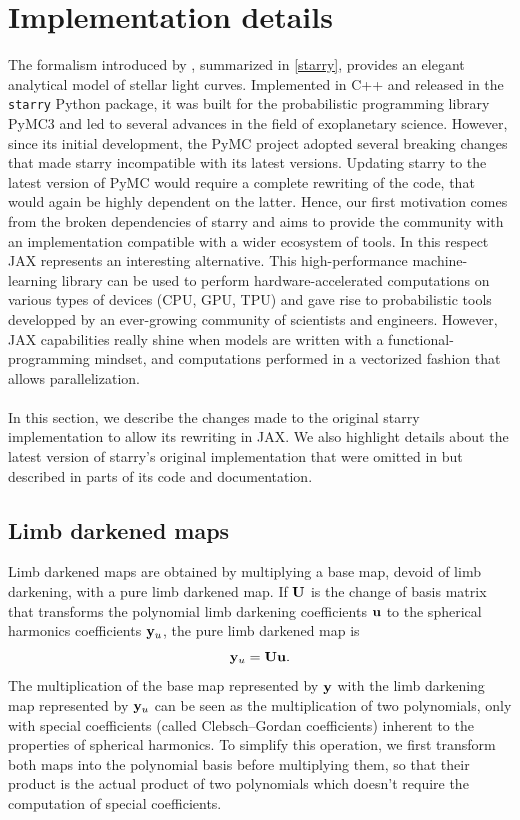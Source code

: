 \documentclass[modern]{aastex631}
\begin{document}
\section{Implementation details}\label{optimization}
The formalism introduced by \cite{starry}, summarized in \autoref{starry}, provides an elegant analytical model of stellar light curves. Implemented in C++ and released in the \texttt{starry} Python package, it was built for the probabilistic programming library \textsf{PyMC3} and led to several advances in the field of exoplanetary science. However, since its initial development, the \textsf{PyMC} project adopted several breaking changes that made \textsf{starry} incompatible with its latest versions. Updating \textsf{starry} to the latest version of \textsf{PyMC} would require a complete rewriting of the code, that would again be highly dependent on the latter. Hence, our first motivation comes from the broken dependencies of \textsf{starry} and aims to provide the community with an implementation compatible with a wider ecosystem of tools. In this respect \textsf{JAX} represents an interesting alternative. This high-performance machine-learning library can be used to perform hardware-accelerated computations on various types of devices (CPU, GPU, TPU) and gave rise to probabilistic tools developped by an ever-growing community of scientists and engineers. However, \textsf{JAX} capabilities really shine when models are written with a functional-programming mindset, and computations performed in a vectorized fashion that allows parallelization.\\\\
In this section, we describe the changes made to the original \textsf{starry} implementation to allow its rewriting in \textsf{JAX}. We also highlight details about the latest version of \textsf{starry}'s original implementation that were omitted in \citealt{starry} but described in parts of its code and documentation. 

\subsection{Limb darkened maps}
Limb darkened maps are obtained by multiplying a base map, devoid of limb darkening, with a pure limb darkened map. If ${\mathbf{U}}$ is the change of basis matrix that transforms the polynomial limb darkening coefficients ${\mathbf{u}}$ to the spherical harmonics coefficients ${\mathbf{y}}_u$, the pure limb darkened map is
\begin{equation}
    \label{eq:limb_darkening_map}
    \bvec{y}_u = \bvec{U}\bvec{u}.
\end{equation}
The multiplication of the base map represented by ${\mathbf{y}}$ with the limb darkening map represented by ${\mathbf{y}}_u$ can be seen as the multiplication of two polynomials, only with special coefficients (called Clebsch–Gordan coefficients) inherent to the properties of spherical harmonics. To simplify this operation, we first transform both maps into the polynomial basis before multiplying them, so that their product is the actual product of two polynomials which doesn't require the computation of special coefficients.
\end{document}
